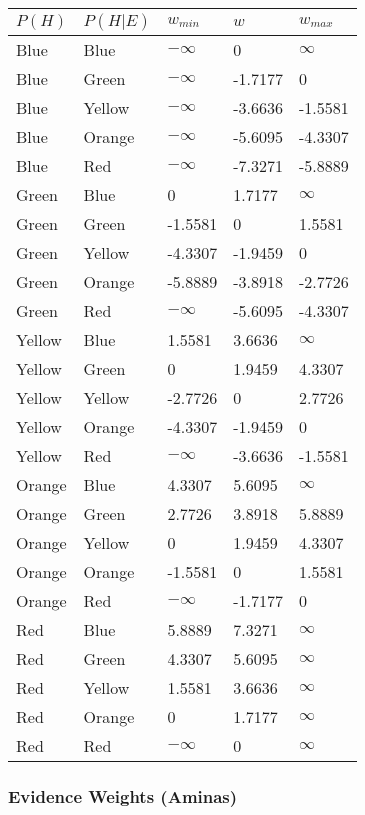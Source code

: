 \documentclass[
]{article}
\begin{document}
\begin{longtable}[]{@{}lllll@{}}
\toprule\noalign{}
\(P(H)\) & \(P(H|E)\) & \(w_{min}\) & \(w\) & \(w_{max}\) \\
\midrule\noalign{}
\endhead
\bottomrule\noalign{}
\endlastfoot
Blue & Blue & \(-\infty\) & 0 & \(\infty\) \\
Blue & Green & \(-\infty\) & -1.7177 & 0 \\
Blue & Yellow & \(-\infty\) & -3.6636 & -1.5581 \\
Blue & Orange & \(-\infty\) & -5.6095 & -4.3307 \\
Blue & Red & \(-\infty\) & -7.3271 & -5.8889 \\
Green & Blue & 0 & 1.7177 & \(\infty\) \\
Green & Green & -1.5581 & 0 & 1.5581 \\
Green & Yellow & -4.3307 & -1.9459 & 0 \\
Green & Orange & -5.8889 & -3.8918 & -2.7726 \\
Green & Red & \(-\infty\) & -5.6095 & -4.3307 \\
Yellow & Blue & 1.5581 & 3.6636 & \(\infty\) \\
Yellow & Green & 0 & 1.9459 & 4.3307 \\
Yellow & Yellow & -2.7726 & 0 & 2.7726 \\
Yellow & Orange & -4.3307 & -1.9459 & 0 \\
Yellow & Red & \(-\infty\) & -3.6636 & -1.5581 \\
Orange & Blue & 4.3307 & 5.6095 & \(\infty\) \\
Orange & Green & 2.7726 & 3.8918 & 5.8889 \\
Orange & Yellow & 0 & 1.9459 & 4.3307 \\
Orange & Orange & -1.5581 & 0 & 1.5581 \\
Orange & Red & \(-\infty\) & -1.7177 & 0 \\
Red & Blue & 5.8889 & 7.3271 & \(\infty\) \\
Red & Green & 4.3307 & 5.6095 & \(\infty\) \\
Red & Yellow & 1.5581 & 3.6636 & \(\infty\) \\
Red & Orange & 0 & 1.7177 & \(\infty\) \\
Red & Red & \(-\infty\) & 0 & \(\infty\) \\
\end{longtable}

\pagebreak

\subsubsection{Evidence Weights
(Aminas)}\label{evidence-weights-aminas-2}
\end{document}
